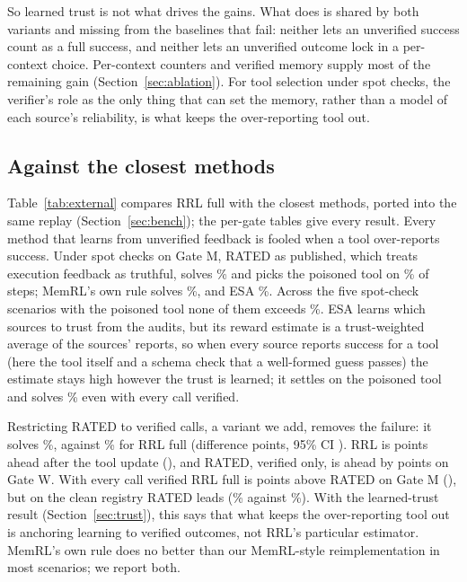 \documentclass[11pt]{article}
\begin{document}
So learned trust is not what drives the gains. What does is shared by both variants and missing
from the baselines that fail: neither lets an unverified success count as a full success, and
neither lets an unverified outcome lock in a per-context choice. Per-context counters and
verified memory supply most of the remaining gain (Section~\ref{sec:ablation}). For tool
selection under spot checks, the verifier's role as the only thing that can set the memory,
rather than a model of each source's reliability, is what keeps the over-reporting tool out.

\subsection{Against the closest methods}
\label{sec:external}



Table~\ref{tab:external} compares RRL full with the closest methods, ported into the same replay
(Section~\ref{sec:bench}); the per-gate tables give every result. Every method that learns from
unverified feedback is fooled when a tool over-reports success. Under spot checks on Gate M,
RATED as published, which treats execution feedback as truthful, solves \MspotRated\% and picks
the poisoned tool on \MspotRatedPoison\% of steps; MemRL's own rule solves \MspotMemOff\%, and ESA
\MspotCesa\%. Across the five spot-check scenarios with the poisoned tool none of them exceeds
\FaceValueMax\%. ESA learns which sources to trust from the audits, but its reward estimate is a
trust-weighted average of the sources' reports, so when every source reports success for a tool
(here the tool itself and a schema check that a well-formed guess passes) the estimate stays high
however the trust is learned; it settles on the poisoned tool and solves \MverCesa\% even with
every call verified.

Restricting RATED to verified calls, a variant we add, removes the failure: it solves
\MspotRatedVer\%, against \MspotRRL\% for RRL full (difference \MspotVsRatedVer{} points, 95\% CI
\MspotVsRatedVerCI). RRL is \MupspotVsRatedVerAbs{} points ahead after the tool update
(\MupspotVsRatedVerCI), and RATED, verified only, is ahead by \WspotRatedVerLead{} points on Gate W.
With every call verified RRL full is \MverVsRatedAbs{} points above RATED on Gate M
(\MverVsRatedCI),
but on the clean registry RATED leads (\CleanVerRated\% against \CleanVerRRL\%). With the
learned-trust result (Section~\ref{sec:trust}), this says that what keeps the over-reporting tool
out is anchoring learning to verified outcomes, not RRL's particular estimator. MemRL's own rule
does no better than our MemRL-style reimplementation in most scenarios; we report both.
\end{document}
